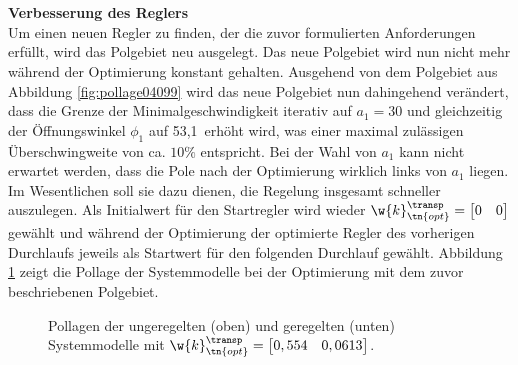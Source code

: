 \\ \\
\textbf{Verbesserung des Reglers} \\ 
Um einen neuen Regler zu finden, der die zuvor formulierten Anforderungen erfüllt, wird das Polgebiet neu ausgelegt. Das neue Polgebiet wird nun nicht mehr während der Optimierung konstant gehalten. Ausgehend von dem Polgebiet aus Abbildung \ref{fig:pollage04099} wird das neue Polgebiet nun dahingehend verändert, dass die Grenze der Minimalgeschwindigkeit iterativ auf $a_1 = 30$ und gleichzeitig der Öffnungswinkel $\phi_1$ auf 53,1\textdegree \, erhöht wird, was einer maximal zulässigen Überschwingweite von ca. $10\%$ entspricht. Bei der Wahl von $a_1$ kann nicht erwartet werden, dass die Pole nach der Optimierung wirklich links von $a_1$ liegen. Im Wesentlichen soll sie dazu dienen, die Regelung insgesamt schneller auszulegen. Als Initialwert für den Startregler wird wieder $\w{k}_\tn{opt}^\transp = \begin{bmatrix}	0 & 0 \\ \end{bmatrix} $ gewählt und während der Optimierung der optimierte Regler des vorherigen Durchlaufs jeweils als Startwert für den folgenden Durchlauf gewählt. Abbildung \ref{fig:pollage0554} zeigt die Pollage der Systemmodelle bei der Optimierung mit dem zuvor beschriebenen Polgebiet.
\begin{figure}[h]
	\centering
	\caption[pollage0554]{Pollagen der ungeregelten (oben) und geregelten (unten) Systemmodelle mit $\w{k}_\tn{opt}^\transp = \begin{bmatrix}	0,554 & 0,0613 \\ \end{bmatrix} $.}
	\label{fig:pollage0554}
\end{figure}
